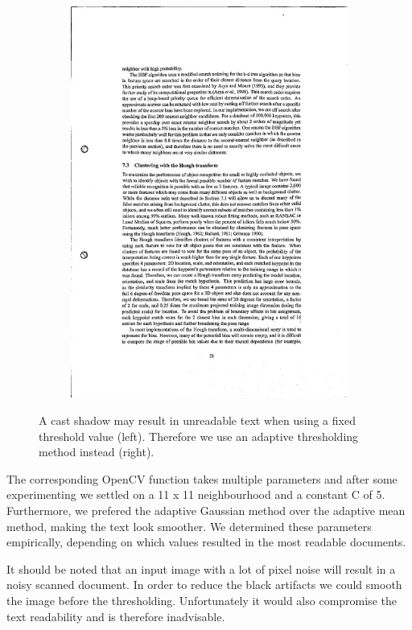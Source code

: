\documentclass[bibliography=totoc]{scrartcl}
\begin{document}
\begin{figure}[h!]
\begin{subfigure}[b]{0.3\linewidth}
			\includegraphics[width=\linewidth]{imgs/threshold/bad_lighting_adaptive.jpg}
		\end{subfigure}
		\caption{A cast shadow may result in unreadable text when using a fixed threshold value (left). Therefore we use an adaptive thresholding method instead (right).}
		\label{fig:thresholding}
	\end{figure}


	The corresponding OpenCV function takes multiple parameters and after some experimenting we settled on a 11 x 11 neighbourhood and a constant C of 5. 
	Furthermore, we prefered the adaptive Gaussian method over the adaptive mean method, making the text look smoother.
	We determined these parameters empirically, depending on which values resulted in the most readable documents.

	It should be noted that an input image with a lot of pixel noise will result in a noisy scanned document.
	In order to reduce the black artifacts we could smooth the image before the thresholding. 
	Unfortunately it would also compromise the text readability and is therefore inadvisable. \\
\end{document}
